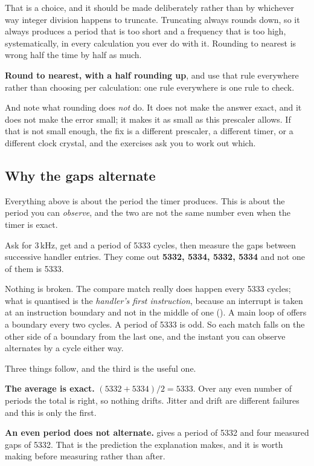 That is a choice, and it should be made deliberately rather than by whichever way integer division
happens to truncate. Truncating always rounds down, so it always produces a period that is too
short and a frequency that is too high, systematically, in every calculation you ever do with it.
Rounding to nearest is wrong half the time by half as much.

\textbf{Round to nearest, with a half rounding up}, and use that rule everywhere rather than
choosing per calculation: one rule everywhere is one rule to check.

And note what rounding does \emph{not} do. It does not make the answer exact, and it does not make
the error small; it makes it as small as this prescaler allows. If that is not small enough, the
fix is a different prescaler, a different timer, or a different clock crystal, and the exercises
ask you to work out which.

\subsection{Why the gaps alternate}
\label{c5:sec:alternate}
Everything above is about the period the timer produces. This is about the period you can
\emph{observe}, and the two are not the same number even when the timer is exact.

Ask for 3\,kHz, get  and a period of 5333 cycles, then measure the gaps between
successive handler entries. They come out \textbf{5332, 5334, 5332, 5334} and not one of them is
5333.

Nothing is broken. The compare match really does happen every 5333 cycles; what is quantised is
the \emph{handler's first instruction}, because an interrupt is taken at an instruction boundary
and not in the middle of one (). A main loop of  offers a
boundary every two cycles. A period of 5333 is odd. So each match falls on the other side of a
boundary from the last one, and the instant you can observe alternates by a cycle either way.

Three things follow, and the third is the useful one.

\textbf{The average is exact.} $(5332 + 5334) / 2 = 5333$. Over any even number of periods the
total is right, so nothing drifts. Jitter and drift are different failures and this is only the
first.

\textbf{An even period does not alternate.}  gives a period of 5332 and four
measured gaps of 5332. That is the prediction the explanation makes, and it is worth making before
measuring rather than after.

